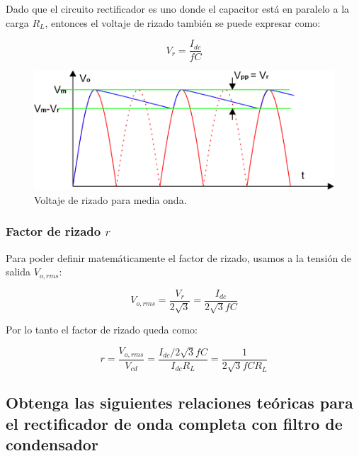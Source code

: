 \documentclass[a4paper]{IEEEtran} %
\begin{document}
Dado que el circuito rectificador es uno donde el capacitor está en paralelo a la carga $R_L$, entonces el voltaje de rizado también se puede expresar como:

\begin{equation}
	V_r = \frac{I_{dc}}{fC}
\end{equation}

\begin{figure}[h!]
	\centering
	\includegraphics[scale=1]{IMAGENES/rizado1}
	\caption{Voltaje de rizado para media onda.}
	\label{rizado1}
\end{figure}



\subsubsection{Factor de rizado $r$}

Para poder definir matemáticamente el factor de rizado, usamos a la tensión de salida $V_{o,rms}$:

\begin{equation}
	V_{o,rms} = \frac{V_r}{2 \sqrt{3}} = \frac{I_{dc}}{2 \sqrt{3} fC}
\end{equation}

Por lo tanto el factor de rizado queda como:

\begin{equation}
	\label{frizado_media}
	r = \frac{V_{o,rms}}{V_{cd}} = \frac{I_{dc}/2\sqrt{3} fC}{I_{dc} R_L} = \frac{1}{2 \sqrt{3} f C R_L}
\end{equation}


\subsection{Obtenga las siguientes relaciones teóricas para el rectificador de onda completa con filtro de condensador}
\end{document}
